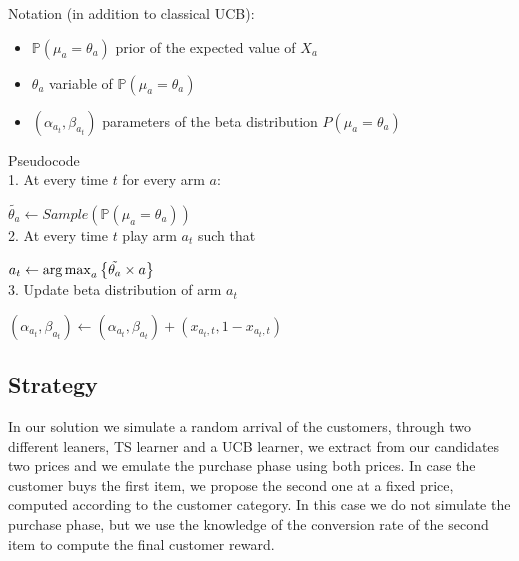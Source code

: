Notation (in addition to classical UCB):\\
\begin{itemize}
	\item $\mathbb P(\mu_{a}=\theta_{a})$ prior of the expected value of $X_{a}$
	\item $\theta_{a}$ variable of $\mathbb P(\mu_{a}=\theta_{a})$
	\item $(\alpha_{a_{t}}, \beta_{a_{t}})$ parameters of the beta distribution $P(\mu_{a}=\theta_{a})$
\end{itemize}

Pseudocode\\

1. At every time $t$ for every arm $a$:

$\tilde{\theta_{a}} \leftarrow Sample(\mathbb P(\mu_{a}=\theta_{a}))$ \\

2. At every time $t$ play arm $a_{t}$ such that 

$a_{t} \leftarrow \operatorname{arg\,max}_a \left\{ \tilde{\theta_{a}} \times a \right\} $ \\

3.  Update beta distribution of arm $a_{t}$

$(\alpha_{a_{t}}, \beta_{a_{t}}) \leftarrow (\alpha_{a_{t}}, \beta_{a_{t}}) + (x_{a_{t},t}, 1 - x_{a_{t},t})$


\subsection*{Strategy}

In our solution we simulate a random arrival of the customers, through two different leaners, TS learner and a UCB learner, we extract from our candidates two prices and we emulate the purchase phase using both prices. In case the customer buys the first item, we propose the second one at a fixed price, computed according to the customer category. In this case we do not simulate the purchase phase, but we use the knowledge of the conversion rate of the second item to compute the final customer reward. 

